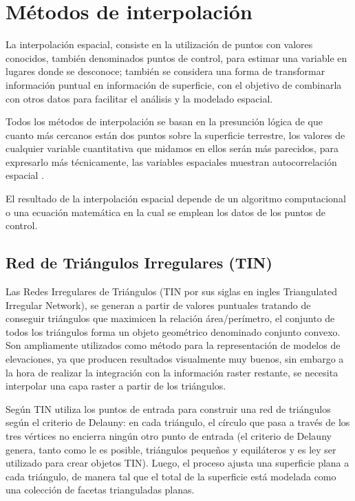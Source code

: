 \section{Métodos de interpolación}
\label{sec:cap2-metodos-interpolacion}

La interpolación espacial, consiste en la utilización de puntos con valores conocidos, también denominados puntos
de control, para estimar una variable en lugares donde se desconoce; también se considera una forma de transformar
información puntual en información de superficie, con el objetivo de combinarla con otros datos para facilitar el
análisis y la modelado espacial.

Todos los métodos de interpolación se basan en la presunción lógica de que cuanto más cercanos están dos puntos
sobre la superficie terrestre, los valores de cualquier variable cuantitativa que midamos en ellos serán más
parecidos, para expresarlo más técnicamente, las variables espaciales muestran autocorrelación espacial \cite{fAlonsoSig2006}.

El resultado de la interpolación espacial depende de un algoritmo computacional o una ecuación matemática en la
cual se emplean los datos de los puntos de control\cite{NINO2011}.


\subsection {Red de Triángulos Irregulares (TIN)}
Las Redes Irregulares de Triángulos (TIN por sus siglas en ingles Triangulated Irregular Network), se generan a
partir de valores puntuales tratando de conseguir triángulos que maximicen la relación área/perímetro, el conjunto
de todos los triángulos forma un objeto geométrico denominado conjunto convexo\cite{fAlonsoSig2006}. Son
ampliamente utilizados como método para la representación de modelos de elevaciones, ya que producen resultados
visualmente muy buenos, sin embargo a la hora de realizar la integración con la información raster restante, se
necesita interpolar una capa raster a partir de los triángulos.

Según \cite{cPachecoMDE2003} TIN utiliza los puntos de entrada para construir una red de triángulos según el
criterio de Delauny: en cada triángulo, el círculo que pasa a través de los tres vértices no encierra ningún otro
punto de entrada (el criterio de Delauny genera, tanto como le es posible, triángulos pequeños y equiláteros y es
ley ser utilizado para crear objetos TIN). Luego, el proceso ajusta una superficie plana a cada triángulo, de
manera tal que el total de la superficie está modelada como una colección de facetas trianguladas planas.


